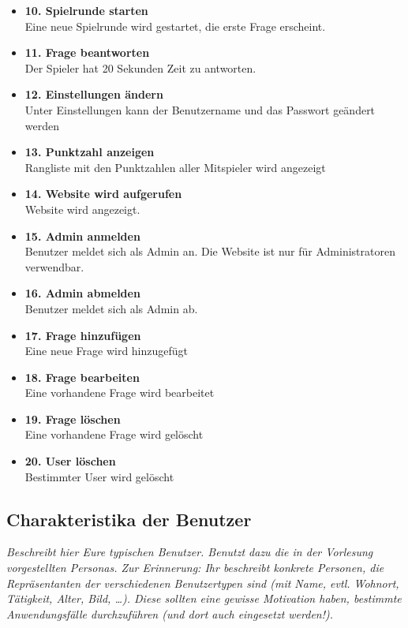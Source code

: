 \documentclass[fontsize=12pt,paper=a4,twoside]{scrartcl}
\begin{document}
\begin{itemize}
	\item \textbf{10. Spielrunde starten}\\
	Eine neue Spielrunde wird gestartet, die erste Frage erscheint.
	\item \textbf{11. Frage beantworten}\\
	Der Spieler hat 20 Sekunden Zeit zu antworten.
	\item \textbf{12. Einstellungen ändern}\\
	Unter Einstellungen kann der Benutzername und das Passwort geändert werden
	\item \textbf{13. Punktzahl anzeigen}\\
	Rangliste mit den Punktzahlen aller Mitspieler wird angezeigt
	\item \textbf{14. Website wird aufgerufen}\\
	Website wird angezeigt.
	\item \textbf{15. Admin anmelden}\\
	Benutzer meldet sich als Admin an. Die Website ist nur für Administratoren verwendbar.
	\item \textbf{16. Admin abmelden}\\
	Benutzer meldet sich als Admin ab.
	\item \textbf{17. Frage hinzufügen}\\
	Eine neue Frage wird hinzugefügt
	\item \textbf{18. Frage bearbeiten}\\
	Eine vorhandene Frage wird bearbeitet
	\item \textbf{19. Frage löschen}\\
	Eine vorhandene Frage wird gelöscht
	\item \textbf{20. User löschen}\\
	Bestimmter User wird gelöscht
\end{itemize}

\subsection{Charakteristika der Benutzer}
  {\em Beschreibt hier Eure typischen Benutzer. Benutzt dazu die in
  der Vorlesung vorgestellten Personas. Zur Erinnerung: Ihr beschreibt
  konkrete Personen, die Repräsentanten der verschiedenen
  Benutzertypen sind (mit Name, evtl. Wohnort, Tätigkeit, Alter, Bild,
  \ldots). Diese sollten eine gewisse Motivation haben, bestimmte
  Anwendungsfälle durchzuführen (und dort auch eingesetzt werden!).}
\end{document}
